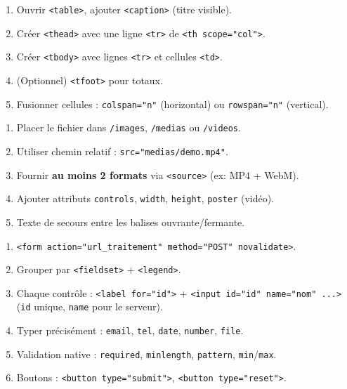 \documentclass[11pt]{article}
\begin{document}
\begin{bilan}
\begin{methode}
\begin{enumerate}
    \item Ouvrir \texttt{<table>}, ajouter \texttt{<caption>} (titre visible).
    \item Créer \texttt{<thead>} avec une ligne \texttt{<tr>} de \texttt{<th scope="col">}.
    \item Créer \texttt{<tbody>} avec lignes \texttt{<tr>} et cellules \texttt{<td>}.
    \item (Optionnel) \texttt{<tfoot>} pour totaux.
    \item Fusionner cellules : \texttt{colspan="n"} (horizontal) ou \texttt{rowspan="n"} (vertical).
\end{enumerate}
\end{methode}

\begin{methode}
\begin{enumerate}
    \item Placer le fichier dans \texttt{/images}, \texttt{/medias} ou \texttt{/videos}.
    \item Utiliser chemin relatif : \texttt{src="medias/demo.mp4"}.
    \item Fournir \textbf{au moins 2 formats} via \texttt{<source>} (ex: MP4 + WebM).
    \item Ajouter attributs \texttt{controls}, \texttt{width}, \texttt{height}, \texttt{poster} (vidéo).
    \item Texte de secours entre les balises ouvrante/fermante.
\end{enumerate}
\end{methode}

\begin{methode}
\begin{enumerate}
    \item \texttt{<form action="url\_traitement" method="POST" novalidate>}.
    \item Grouper par \texttt{<fieldset>} + \texttt{<legend>}.
    \item Chaque contrôle : \texttt{<label for="id">} + \texttt{<input id="id" name="nom" ...>} (\texttt{id} unique, \texttt{name} pour le serveur).
    \item Typer précisément : \texttt{email}, \texttt{tel}, \texttt{date}, \texttt{number}, \texttt{file}.
    \item Validation native : \texttt{required}, \texttt{minlength}, \texttt{pattern}, \texttt{min}/\texttt{max}.
    \item Boutons : \texttt{<button type="submit">}, \texttt{<button type="reset">}.
\end{enumerate}
\end{methode}


\end{bilan}
\end{document}
